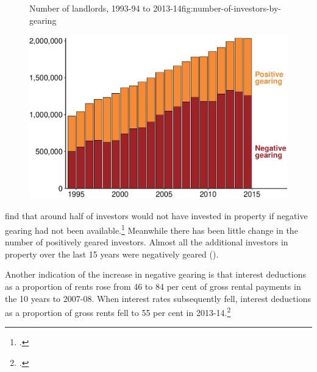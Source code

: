 \begin{figure}
%
{Number of landlords, 1993-94 to 2013-14}{fig:number-of-investors-by-gearing}

\includegraphics[width=\columnwidth]{CGT-NG-atlas//number-of-investors-by-gearing-1}
\end{figure}

\textcite{seelig2009understanding} find that around half of investors would not have invested in property if negative gearing had not been available.\footcite[][63]{seelig2009understanding} 
Meanwhile there has been little change in the number of positively geared investors. Almost all the additional investors in property over the last 15 years were negatively geared ().

Another indication of the increase in negative gearing is that interest deductions as a proportion of rents rose from 46 to 84 per cent of gross rental payments in the 10 years to 2007-08. 
When interest rates subsequently fell, interest deductions as a proportion of gross rents fell to 55 per cent in 2013-14.\footcite[][65]{Treasury2015ReThink}

